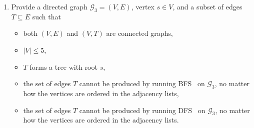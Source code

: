 \documentclass[dvipsnames]{article}
\begin{document}
\begin{enumerate}
\begin{enumerate}
    \color{blue}
    \textbf{Answer:} $\Theta(\log_t(|V|))$
    \color{black}

    \item {}

    \color{blue}
    \textbf{Answer:} $\Theta(\log_t(|V|))$
    \color{black}

    \item {}

    \color{blue}
    \textbf{Answer:} $\Theta(|V| \cdot \log_t(|V|))$
    \color{black}
  \end{enumerate}

  Assume that , , and  arguments above are \emph{references} to vertex objects, not just labels.

  Briefly justify your answer (1--2 sentences).

  \color{blue}
  \textbf{Justification:}\\
  \textbf{1.} Since the links to the vertices are initially given, you can apply a B-tree search for the vertex $v$.  In the worst case, it will take $\Theta(\log_t(|V|))$.\\
\textbf{2.} Adding a new vertex to the list is constant $\Theta(1)$.\\
    \textbf{3.} Adding a side takes adding a new vertex to the B-tree for both vertices. In the worst case, it will take $\Theta(\log_t(|V|))$.\\
    \textbf{4.} In fact, it is the same as adding, but only removing edges for each vertex $\Theta(\log_t(|V|))$.\\
    \textbf{5.} In the worst case, we look through the list of vertices and for each vertex($|V|$) we delete the edge associated with $v$ in its B-tree for $\Theta(\log_t(|V|))$. Deleting a vertex will take $\Theta(|E|\cdot\log_t(|V|))$.
  \color{black}

  \item Provide a directed graph $\mathcal{G}_3 = (V, E)$, vertex $s \in V$, and a subset of edges $T \subseteq E$ such that
  \begin{itemize}
    \item both $(V, E)$ and $(V, T)$ are connected graphs,
    \item $|V| \leq 5$,
    \item $T$ forms a tree with root $s$,
    \item the set of edges $T$ cannot be produced by running BFS~\cite[\S 20.2]{Cormen2022} on $\mathcal{G}_3$, no matter how the vertices are ordered in the adjacency lists,
    \item the set of edges $T$ cannot be produced by running DFS~\cite[\S 20.3]{Cormen2022} on $\mathcal{G}_3$, no matter how the vertices are ordered in the adjacency lists.
  \end{itemize}


\end{enumerate}
\end{document}
